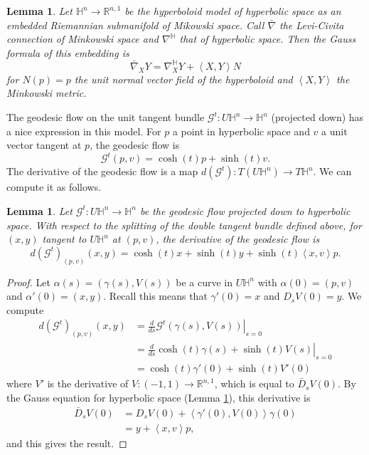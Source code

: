 \documentclass{amsart}
\newcommand{\R}{\mathbb{R}}
\newtheorem{lem}[thm]{Lemma}
\renewcommand{\H}{\mathbb{H}}
\begin{document}
\begin{lem}
\label{HypAsSub}
Let $\H^n \to \R^{n,1}$ be the hyperboloid model of hyperbolic space as an embedded Riemannian submanifold of Mikowski space. Call $\bar{\nabla}$ the Levi-Civita connection of Minkowski space and $\nabla^{\H}$ that of hyperbolic space. Then the Gauss formula of this embedding is 
\[
\bar{\nabla}_XY = \nabla^{\H}_XY + \left<X,Y\right>N
\]
for $N(p) = p$ the unit normal vector field of the hyperboloid and $\left<X,Y \right>$ the Minkowski metric.
\end{lem}

The geodesic flow on the unit tangent bundle $\mathcal{G}^t :U \H^n \to \H^n$ (projected down) has a nice expression in this model. 
For $p$ a point in hyperbolic space and $v$ a unit vector tangent at $p$, the geodesic flow is
\[
\mathcal{G}^t(p,v) = \cosh(t)p + \sinh(t)v.
\]
The derivative of the geodesic flow is a map $d(\mathcal{G}^t) : T(U\H^n) \to T\H^n$.
We can compute it as follows.

\begin{lem}
\label{DerGeo}
Let $\mathcal{G}^t: U\H^n \to \H^n$ be the geodesic flow projected down to hyperbolic space. With respect to the splitting of the double tangent bundle defined above, for $(x,y)$ tangent to $U\H^n$ at $(p,v)$, the derivative of the geodesic flow is 
\[
d(\mathcal{G}^t)_{(p,v)}(x,y) = \cosh(t)x + \sinh(t)y + \sinh(t)\left<x,v\right>p.
\]
\end{lem}

\begin{proof}
Let $\alpha(s) = (\gamma(s),V(s))$ be a curve in $U\H^n$ with $\alpha(0) = (p,v)$ and $\alpha'(0) = (x,y)$. 
Recall this means that $\gamma'(0) = x$ and $D_sV(0) = y$.
We compute
\begin{align*}
d(\mathcal{G}^t)_{(p,v)}(x,y)
&= \left. \frac{d}{ds} \mathcal{G}^t(\gamma(s),V(s)) \right|_{s=0} \\
&= \left. \frac{d}{ds} \cosh(t)\gamma(s) + \sinh(t)V(s) \right|_{s=0} \\
&= \cosh(t)\gamma'(0) + \sinh(t)V'(0)
\end{align*}
where $V'$ is the derivative of $V: (-1,1) \to \R^{n,1}$, which is equal to $\bar{D}_sV(0)$.
By the Gauss equation for hyperbolic space (Lemma \ref{HypAsSub}), this derivative is 
\begin{align*}
\bar{D}_sV(0) 
&= D_sV(0) + \left<\gamma'(0),V(0)\right>\gamma(0) \\
&= y + \left< x, v \right>p,
\end{align*}
and this gives the result. 
\end{proof}
\end{document}
